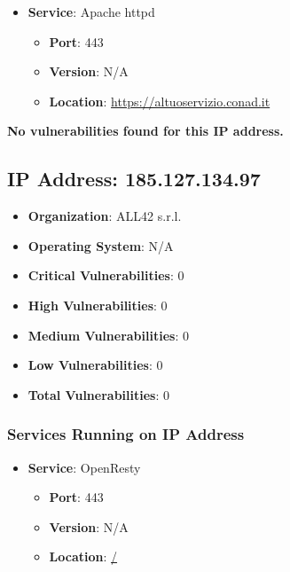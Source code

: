 \documentclass{article}
\begin{document}
\begin{itemize}
    
        \item \textbf{Service}: Apache httpd
        \begin{itemize}
            \item \textbf{Port}: 443
            \item \textbf{Version}:  N/A 
            \item \textbf{Location}: \href{ https://altuoservizio.conad.it }{ https://altuoservizio.conad.it }
        \end{itemize}
    
\end{itemize}


\textbf{No vulnerabilities found for this IP address.}




\clearpage



\subsection{IP Address: 185.127.134.97}

\begin{itemize}
    \item \textbf{Organization}: ALL42 s.r.l.
    \item \textbf{Operating System}:  N/A 
    \item \textbf{Critical Vulnerabilities}: 0
    \item \textbf{High Vulnerabilities}: 0
    \item \textbf{Medium Vulnerabilities}: 0
    \item \textbf{Low Vulnerabilities}: 0
    \item \textbf{Total Vulnerabilities}: 0
\end{itemize}

\subsubsection*{Services Running on IP Address}

\begin{itemize}
    
        \item \textbf{Service}: OpenResty
        \begin{itemize}
            \item \textbf{Port}: 443
            \item \textbf{Version}:  N/A 
            \item \textbf{Location}: \href{ / }{ / }
        \end{itemize}
    
\end{itemize}
\end{document}
